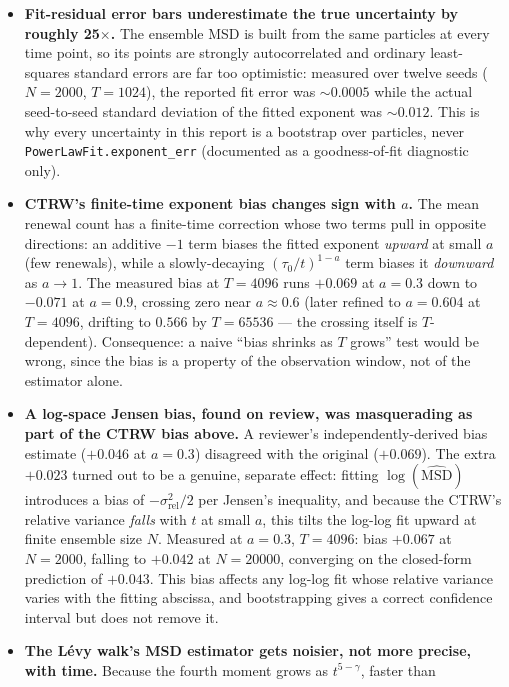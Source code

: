 \documentclass[11pt]{article}
\newcommand{\code}[1]{\texttt{#1}}
\begin{document}
\begin{itemize}
\item \textbf{Fit-residual error bars underestimate the true uncertainty by
  roughly 25$\times$.} The ensemble MSD is built from the same particles at
  every time point, so its points are strongly autocorrelated and ordinary
  least-squares standard errors are far too optimistic: measured over twelve
  seeds ($N{=}2000$, $T{=}1024$), the reported fit error was $\sim 0.0005$
  while the actual seed-to-seed standard deviation of the fitted exponent was
  $\sim 0.012$. This is why every uncertainty in this report is a bootstrap
  over particles, never \code{PowerLawFit.exponent\_err} (documented as a
  goodness-of-fit diagnostic only).
\item \textbf{CTRW's finite-time exponent bias changes sign with $a$.} The
  mean renewal count has a finite-time correction whose two terms pull in
  opposite directions: an additive $-1$ term biases the fitted exponent
  \emph{upward} at small $a$ (few renewals), while a slowly-decaying
  $(\tau_0/t)^{1-a}$ term biases it \emph{downward} as $a\to 1$. The measured
  bias at $T=4096$ runs $+0.069$ at $a=0.3$ down to $-0.071$ at $a=0.9$,
  crossing zero near $a\approx 0.6$ (later refined to $a=0.604$ at
  $T{=}4096$, drifting to $0.566$ by $T{=}65536$ --- the crossing itself is
  $T$-dependent). Consequence: a naive ``bias shrinks as $T$ grows'' test
  would be wrong, since the bias is a property of the observation window, not
  of the estimator alone.
\item \textbf{A log-space Jensen bias, found on review, was masquerading as
  part of the CTRW bias above.} A reviewer's independently-derived bias
  estimate ($+0.046$ at $a=0.3$) disagreed with the original ($+0.069$). The
  extra $+0.023$ turned out to be a genuine, separate effect: fitting
  $\log(\widehat{\mathrm{MSD}})$ introduces a bias of
  $-\sigma^2_{\mathrm{rel}}/2$ per Jensen's inequality, and because the
  CTRW's relative variance \emph{falls} with $t$ at small $a$, this tilts the
  log-log fit upward at finite ensemble size $N$. Measured at $a=0.3$,
  $T=4096$: bias $+0.067$ at $N{=}2000$, falling to $+0.042$ at $N{=}20000$,
  converging on the closed-form prediction of $+0.043$. This bias affects any
  log-log fit whose relative variance varies with the fitting abscissa, and
  bootstrapping gives a correct confidence interval but does not remove it.
\item \textbf{The L\'evy walk's MSD estimator gets noisier, not more precise,
  with time.} Because the fourth moment grows as $t^{5-\gamma}$, faster than

\end{itemize}
\end{document}
